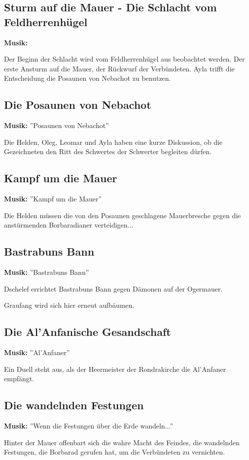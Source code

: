 \subsection{Sturm auf die Mauer - Die Schlacht vom Feldherrenhügel}
\textbf{Musik:} 
 
Der Beginn der Schlacht wird vom Feldherrenhügel aus beobachtet werden. Der erste Ansturm auf die Mauer, der Rückwurf der Verbündeten. Ayla trifft die Entscheidung die Posaunen von Nebachot zu benutzen.

\subsection{Die Posaunen von Nebachot}
\textbf{Musik:} ''Posaunen von Nebachot''
 

Die Helden, Oleg, Leomar und Ayla haben eine kurze Diskussion, ob die Gezeichneten den Ritt des Schwertes der Schwerter begleiten dürfen.

\subsection{Kampf um die Mauer}
\textbf{Musik:} ''Kampf um die Mauer''

Die Helden müssen die von den Posaunen geschlagene Mauerbresche gegen die anstürmenden Borbaradianer verteidigen...

\subsection{Bastrabuns Bann}
\textbf{Musik:} ''Bastrabuns Bann''

Dschelef errichtet Bastrabuns Bann gegen Dämonen auf der Ogermauer.

Graufang wird sich hier erneut aufbäumen.

\subsection{Die Al'Anfanische Gesandschaft}
\textbf{Musik:} ''Al'Anfaner''
 
Ein Duell steht aus, als der Heermeister der Rondrakirche die Al'Anfaner empfängt.

\subsection{Die wandelnden Festungen}
\textbf{Musik:} ''Wenn die Festungen über die Erde wandeln...''

Hinter der Mauer offenbart sich die wahre Macht des Feindes, die wandelnden Festungen, die Borbarad gerufen hat, um die Verbündeten zu vernichten.

